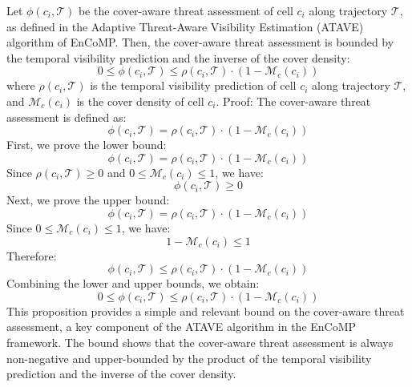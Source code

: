 Let $\phi(c_i, \mathcal{T})$ be the cover-aware threat assessment of cell $c_i$ along trajectory $\mathcal{T}$, as defined in the Adaptive Threat-Aware Visibility Estimation (ATAVE) algorithm of EnCoMP. Then, the cover-aware threat assessment is bounded by the temporal visibility prediction and the inverse of the cover density:
\begin{equation}
0 \leq \phi(c_i, \mathcal{T}) \leq \rho(c_i, \mathcal{T}) \cdot (1 - \mathcal{M}_c(c_i))
\end{equation}
where $\rho(c_i, \mathcal{T})$ is the temporal visibility prediction of cell $c_i$ along trajectory $\mathcal{T}$, and $\mathcal{M}_c(c_i)$ is the cover density of cell $c_i$.
Proof:
The cover-aware threat assessment is defined as:
\begin{equation}
\phi(c_i, \mathcal{T}) = \rho(c_i, \mathcal{T}) \cdot (1 - \mathcal{M}_c(c_i))
\end{equation}
First, we prove the lower bound:
\begin{equation}
\phi(c_i, \mathcal{T}) = \rho(c_i, \mathcal{T}) \cdot (1 - \mathcal{M}_c(c_i))
\end{equation}
Since $\rho(c_i, \mathcal{T}) \geq 0$ and $0 \leq \mathcal{M}_c(c_i) \leq 1$, we have:
\begin{equation}
\phi(c_i, \mathcal{T}) \geq 0
\end{equation}
Next, we prove the upper bound:
\begin{equation}
\phi(c_i, \mathcal{T}) = \rho(c_i, \mathcal{T}) \cdot (1 - \mathcal{M}_c(c_i))
\end{equation}
Since $0 \leq \mathcal{M}_c(c_i) \leq 1$, we have:
\begin{equation}
1 - \mathcal{M}_c(c_i) \leq 1
\end{equation}
Therefore:
\begin{equation}
\phi(c_i, \mathcal{T}) \leq \rho(c_i, \mathcal{T}) \cdot (1 - \mathcal{M}_c(c_i))
\end{equation}
Combining the lower and upper bounds, we obtain:
\begin{equation}
0 \leq \phi(c_i, \mathcal{T}) \leq \rho(c_i, \mathcal{T}) \cdot (1 - \mathcal{M}_c(c_i))
\end{equation}
This proposition provides a simple and relevant bound on the cover-aware threat assessment, a key component of the ATAVE algorithm in the EnCoMP framework. The bound shows that the cover-aware threat assessment is always non-negative and upper-bounded by the product of the temporal visibility prediction and the inverse of the cover density.